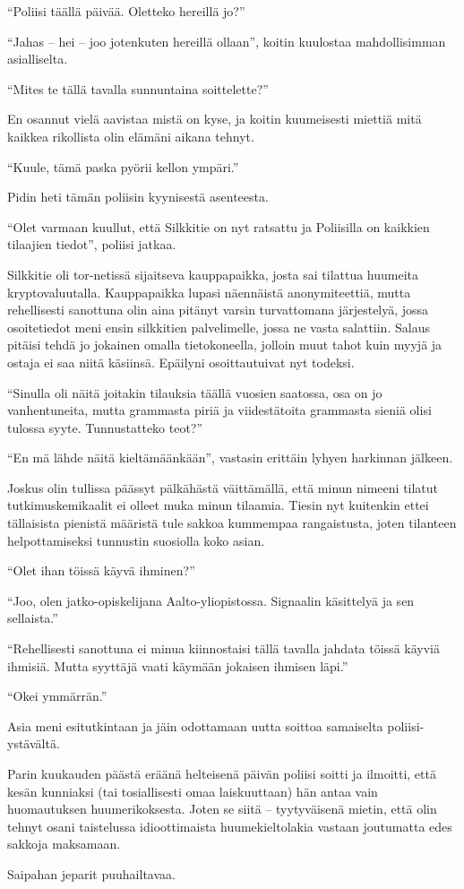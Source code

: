 \documentclass{tsnovel}
\begin{document}
``Poliisi täällä päivää. Oletteko hereillä jo?''

``Jahas – hei – joo jotenkuten hereillä ollaan'', koitin kuulostaa mahdollisimman asialliselta.

``Mites te tällä tavalla sunnuntaina soittelette?''

En osannut vielä aavistaa mistä on kyse, ja koitin kuumeisesti miettiä mitä kaikkea rikollista olin elämäni aikana tehnyt.

``Kuule, tämä paska pyörii kellon ympäri.''

Pidin heti tämän poliisin kyynisestä asenteesta.

``Olet varmaan kuullut, että Silkkitie on nyt ratsattu ja Poliisilla on kaikkien tilaajien tiedot'', poliisi jatkaa.

Silkkitie oli tor-netissä sijaitseva kauppapaikka, josta sai tilattua huumeita kryptovaluutalla. Kauppapaikka lupasi näennäistä anonymiteettiä, mutta rehellisesti sanottuna olin aina pitänyt varsin turvattomana järjestelyä, jossa osoitetiedot meni ensin silkkitien palvelimelle, jossa ne vasta salattiin. Salaus pitäisi tehdä jo jokainen omalla tietokoneella, jolloin muut tahot kuin myyjä ja ostaja  ei saa niitä käsiinsä. Epäilyni osoittautuivat nyt todeksi.

``Sinulla oli näitä joitakin tilauksia täällä vuosien saatossa, osa on jo vanhentuneita, mutta grammasta piriä ja viidestätoita grammasta sieniä olisi tulossa syyte. Tunnustatteko teot?''

``En mä lähde näitä kieltämäänkään'', vastasin erittäin lyhyen harkinnan jälkeen.

Joskus olin tullissa päässyt pälkähästä väittämällä, että minun nimeeni tilatut tutkimuskemikaalit ei olleet muka minun tilaamia. Tiesin nyt kuitenkin ettei tällaisista pienistä määristä tule sakkoa kummempaa rangaistusta, joten tilanteen helpottamiseksi tunnustin suosiolla koko asian.

``Olet ihan töissä käyvä ihminen?''

``Joo, olen jatko-opiskelijana Aalto-yliopistossa. Signaalin käsittelyä ja sen sellaista.''

``Rehellisesti sanottuna ei minua kiinnostaisi tällä tavalla jahdata töissä käyviä ihmisiä. Mutta syyttäjä vaati käymään jokaisen ihmisen läpi.''

``Okei ymmärrän.''

Asia meni esitutkintaan ja jäin odottamaan uutta soittoa samaiselta poliisi-ystävältä.


Parin kuukauden päästä eräänä helteisenä päivän poliisi soitti ja ilmoitti, että kesän kunniaksi (tai tosiallisesti omaa laiskuuttaan) hän antaa vain huomautuksen huumerikoksesta. Joten se siitä – tyytyväisenä mietin, että olin tehnyt osani taistelussa idioottimaista huumekieltolakia vastaan joutumatta edes sakkoja maksamaan.

Saipahan jeparit puuhailtavaa.


\section{}
\end{document}
